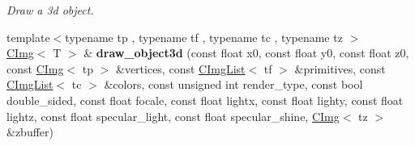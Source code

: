 \begin{DoxyCompactItemize}
\begin{DoxyCompactList}\small\item\em Draw a 3d object. \item\end{DoxyCompactList}\item 
\hypertarget{structcimg__library_1_1CImg_a438acd80c2b721e844d548405dccdee3}{
{\footnotesize template$<$typename tp , typename tf , typename tc , typename tz $>$ }\\\hyperlink{structcimg__library_1_1CImg}{CImg}$<$ T $>$ \& {\bfseries draw\_\-object3d} (const float x0, const float y0, const float z0, const \hyperlink{structcimg__library_1_1CImg}{CImg}$<$ tp $>$ \&vertices, const \hyperlink{structcimg__library_1_1CImgList}{CImgList}$<$ tf $>$ \&primitives, const \hyperlink{structcimg__library_1_1CImgList}{CImgList}$<$ tc $>$ \&colors, const unsigned int render\_\-type, const bool double\_\-sided, const float focale, const float lightx, const float lighty, const float lightz, const float specular\_\-light, const float specular\_\-shine, \hyperlink{structcimg__library_1_1CImg}{CImg}$<$ tz $>$ \&zbuffer)}
\label{structcimg__library_1_1CImg_a438acd80c2b721e844d548405dccdee3}

\end{DoxyCompactItemize}
